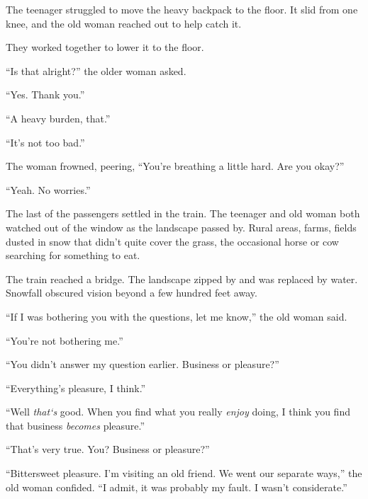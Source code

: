 The teenager struggled to move the heavy backpack to the floor.  It slid from one knee, and the old woman reached out to help catch it.



They worked together to lower it to the floor.



``Is that alright?'' the older woman asked.



``Yes.  Thank you.''



``A heavy burden, that.''



``It's not too bad.''



The woman frowned, peering, ``You're breathing a little hard.  Are you okay?''



``Yeah.  No worries.''



The last of the passengers settled in the train.  The teenager and old woman both watched out of the window as the landscape passed by.  Rural areas, farms, fields dusted in snow that didn't quite cover the grass, the occasional horse or cow searching for something to eat.



The train reached a bridge.  The landscape zipped by and was replaced by water.  Snowfall obscured vision beyond a few hundred feet away.



``If I was bothering you with the questions, let me know,'' the old woman said.



``You're not bothering me.''



``You didn't answer my question earlier.  Business or pleasure?''



``Everything's pleasure, I think.''



``Well \emph{that}\emph{`s }good.  When you find what you really \emph{enjoy} doing, I think you find that business \emph{becomes} pleasure.''



``That's very true.  You?  Business or pleasure?''



``Bittersweet pleasure.  I'm visiting an old friend.  We went our separate ways,'' the old woman confided.  ``I admit, it was probably my fault.  I wasn't considerate.''



